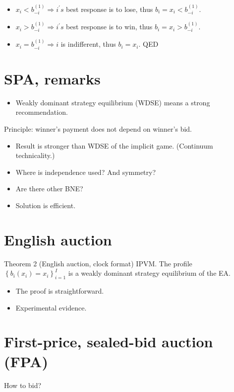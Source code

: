 \documentclass[10pt]{article}
\begin{document}
\begin{itemize}
  \item $x_{i}<b_{-i}^{(1)} \Longrightarrow i^{\prime} s$ best response is to lose, thus $b_{i}=x_{i}<b_{-i}^{(1)}$.
  \item $x_{i}>b_{-i}^{(1)} \Longrightarrow i^{\prime} s$ best response is to win, thus $b_{i}=x_{i}>b_{-i}^{(1)}$.
  \item $x_{i}=b_{-i}^{(1)} \Longrightarrow i$ is indifferent, thus $b_{i}=x_{i}$. QED
\end{itemize}

\section*{SPA, remarks}
\begin{itemize}
  \item Weakly dominant strategy equilibrium (WDSE) means a strong recommendation.
\end{itemize}

Principle: winner's payment does not depend on winner's bid.

\begin{itemize}
  \item Result is stronger than WDSE of the implicit game. (Continuum technicality.)
  \item Where is independence used? And symmetry?
  \item Are there other BNE?
  \item Solution is efficient.
\end{itemize}

\section*{English auction}
Theorem 2 (English auction, clock format) IPVM. The profile $\left\{b_{i}\left(x_{i}\right)=x_{i}\right\}_{i=1}^{I}$ is a weakly dominant strategy equilibrium of the EA.

\begin{itemize}
  \item The proof is straightforward.
  \item Experimental evidence.
\end{itemize}

\section*{First-price, sealed-bid auction (FPA)}
How to bid?
\end{document}
